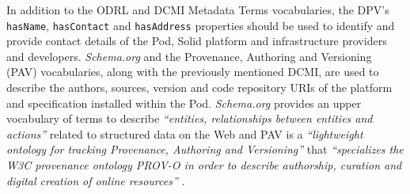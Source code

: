 In addition to the ODRL and DCMI Metadata Terms vocabularies, the DPV's \texttt{hasName}, \texttt{hasContact} and \texttt{hasAddress} properties should be used to identify and provide contact details of the Pod, Solid platform and infrastructure providers and developers. \textit{Schema.org} and the Provenance, Authoring and Versioning (PAV) vocabularies, along with the previously mentioned DCMI, are used to describe the authors, sources, version and code repository URIs of the platform and specification installed within the Pod. \textit{Schema.org} provides an upper vocabulary of terms to describe \textit{``entities, relationships between entities and actions''} related to structured data on the Web \citep{guha_schemaorg_2015} and PAV is a \textit{``lightweight ontology for tracking Provenance, Authoring and Versioning''} that \textit{``specializes the W3C provenance ontology PROV-O in order to describe authorship, curation and digital creation of online resources''} \citep{ciccarese_pav_2013}.

